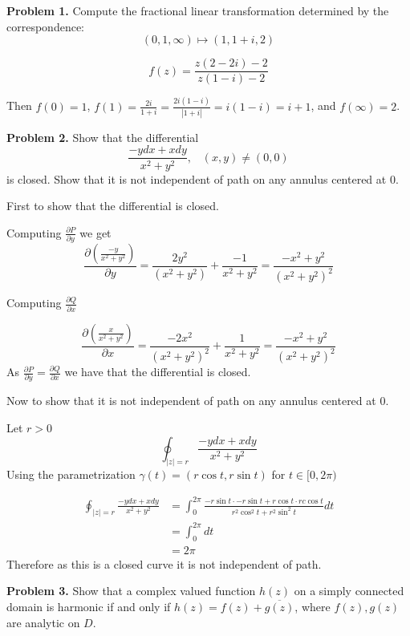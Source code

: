 \documentclass[letter,12pt,reqno]{article}
\date{\today}
\begin{document}
\pagestyle{fancy}


\begin{tcolorbox}
  \textbf{Problem 1.}
    Compute the fractional linear transformation determined by the correspondence:
    \[
        (0,1,\infty)\mapsto (1,1+i,2)
    \]
  
\end{tcolorbox}

\[f(z)=\frac{z(2-2i)-2}{z(1-i)-2}\]

Then $f(0)=1$, $f(1)=\frac{2i}{1+i}=\frac{2i(1-i)}{|1+i|}=i(1-i)=i+1$, and $f(\infty)=2$.

\begin{tcolorbox}
    \textbf{Problem 2.}
    Show that the differential \[\frac{-ydx+xdy}{x^2+y^2},\;\;\;(x,y)\not = (0,0)\]
    is closed. Show that it is not independent of path on any annulus centered at $0$.
\end{tcolorbox}

First to show that the differential is closed. 

Computing $\frac{\partial P}{\partial y}$ we get \[\frac{\partial \left(\frac{-y}{x^2+y^2}\right)}{\partial y}=\frac{2y^2}{(x^2+y^2)}+\frac{-1}{x^2+y^2}=\frac{-x^2+y^2}{(x^2+y^2)^2}\]

Computing $\frac{\partial Q}{\partial x}$

\[
\frac{\partial \left(\frac{x}{x^2+y^2}\right)}{\partial x}=\frac{-2x^2}{(x^2+y^2)^2}+\frac{1}{x^2+y^2}=\frac{-x^2+y^2}{(x^2+y^2)^2}
\]
As $\frac{\partial P}{\partial y}=\frac{\partial Q}{\partial x}$ we have that the differential is closed.

Now to show that it is not independent of path on any annulus centered at $0$. 

Let $r>0$
\[
    \oint_{|z|=r}  \frac{-ydx+xdy}{x^2+y^2}
\]
Using the parametrization $\gamma(t)=(r\cos t,r \sin t)$ for $t\in [0,2\pi)$

\begin{align*}
    \oint_{|z|=r} \frac{-ydx+xdy}{x^2+y^2}&=\int_{0}^{2\pi}\frac{-r\sin t \cdot - r \sin t+r\cos t \cdot r c\cos t}{r^2\cos^2 t+r^2\sin^2t} dt\\
    &=\int_0^{2\pi}dt\\
    &= 2\pi
\end{align*}
Therefore as this is a closed curve it is not independent of path. 
\newpage
\begin{tcolorbox}
    \textbf{Problem 3.} Show that a complex valued function $h(z)$ on a simply connected domain is harmonic if and only if $h(z)=f(z)+\overline{g(z)}$, where $f(z),g(z)$ are analytic on $D$.
\end{tcolorbox}
\end{document}
